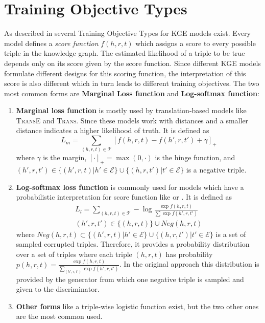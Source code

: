 \section{Training Objective Types}
As described in \cite{cai2017kbgan} several Training Objective Types for \ac{KGE} models exist.
Every model defines a \textit{score function} $f(h,r,t)$ which assigns a score to every possible triple in the knowledge graph.
The estimated likelihood of a triple to be true depends only on its score given by the score function.
Since different \ac{KGE} models formulate different designs for this scoring function, the interpretation of this score is also different which in turn leads to different training objectives.
The two most common forms are \textbf{Marginal Loss function} and \textbf{Log-softmax function}:
\begin{enumerate}
    \item \textbf{Marginal loss function} is mostly used by translation-based models like \textsc{TransE} and \textsc{Trans}.
    Since these models work with distances and a smaller distance indicates a higher likelihood of truth.
    It is defined as 
    \begin{equation}
        L_{m}=\sum_{(h,r,t)\in\mathcal{T}}[f(h,r,t)-f(h',r,t')+\gamma]_+\label{eq:marginalloss}
    \end{equation}
    where $\gamma$ is the margin, $[\cdot]_+=\max(0,\cdot)$ is the hinge function, and $(h',r,t')\in\{(h',r,t)|h'\in\mathcal{E}\}\cup\{(h,r,t')|t'\in\mathcal{E}\}$ is a negative triple.
    
    \item \textbf{Log-softmax loss function} is commonly used for models which have a probabilistic interpretation for score function like \distmult or \complex.
    It is defined as
    \begin{multline}
        L_{l}=\sum_{(h,r,t)\in\mathcal{T}}-\log \frac{\exp f(h,r,t)}{\sum\exp f(h',r,t')}\\
        (h',r,t')\in\{(h,r,t)\}\cup Neg(h,r,t)\label{eq:nllloss}
    \end{multline}
    where $Neg(h,r,t)\subset\{(h',r,t)|h'\in\mathcal{E}\}\cup\{(h,r,t')|t'\in\mathcal{E}\}$ is a set of sampled corrupted triples.
    Therefore, it provides a probability distribution over a set of triples where each triple $(h, r, t)$ has probability $p(h,r,t)=\frac{\exp f(h,r,t)}{\sum_{(h',r,t')}\exp f(h',r,t')}$.
    In the original \kbgan approach this distribution is provided by the generator from which one negative triple is sampled and given to the discriminator.

    \item \textbf{Other forms} like a triple-wise logistic function \cite{ConvE} exist, but the two other ones are the most common used.
\end{enumerate}




